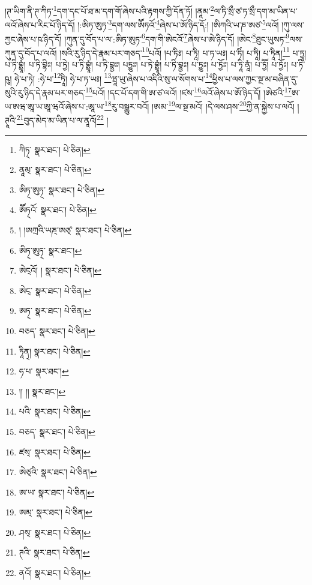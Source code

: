 །ཊ་ཡིག་ནི་ཊ་ཀིཏ་\footnote{ཀིཏ྄་  སྣར་ཐང་།  པེ་ཅིན། }དག་དང་པོ་ཐ་མ་དག་གོ་ཞེས་པའི་རྟགས་ཀྱི་དོན་ཏོ། །ནཱམ་\footnote{ནཱམ྄་  སྣར་ཐང་།  པེ་ཅིན། }ལ་ཏི་སྲྀ་ཙ་ཏ་སྲྀ་དག་མ་ཡིན་པ་ལའོ་ཞེས་པ་རིང་པོ་ཉིད་དོ། །:ཨིཏ་ཨུཏ་\footnote{ཨིཏ྄་ཨུཏ྄་  སྣར་ཐང་།  པེ་ཅིན། }དག་ལས་ཨཽཏའོ་\footnote{ཨཽཏ྄འོ་  སྣར་ཐང་།  པེ་ཅིན། }ཞེས་པ་ཨོ་ཉིད་དོ:། །ཨིཀའི་ཡ་ཎ་ཨཙ་\footnote{། །ཨཀྲའི་ཡཎ྄་ཨཙ྄་  སྣར་ཐང་།  པེ་ཅིན། }ལའོ། །ཀུ་ལས་ཀྱང་ཞེས་པ་ཥ་ཉིད་དོ། །ཀུན་དུ་བོད་པ་ལ་:ཨིཏ་ཨུཏ་\footnote{ཨིཏ྄་ཨུཏ྄་  སྣར་ཐང་། }དག་གི་ཨེངའོ་\footnote{ཨེང྄འོ། །  སྣར་ཐང་།  པེ་ཅིན། }ཞེས་པ་ཨེ་ཉིད་དོ། །ཨེང་\footnote{ཨེང྄་  སྣར་ཐང་།  པེ་ཅིན། }ཐུང་ཡུསཏ་\footnote{ཨཏ྄་  སྣར་ཐང་།  པེ་ཅིན། }ལས་ཀུན་དུ་བོད་པ་ལའོ། །སའི་རུ་ཉིད་དེ་རྣམ་པར་གཅད་\footnote{བཅད་  སྣར་ཐང་།  པེ་ཅིན། }པའོ། །པ་ཏིཿ། པ་ཏཱི། པ་ཏ་ཡཿ། པ་ཏིཾ། པ་ཏཱི། པ་ཏཱིན།\footnote{ཏཱིན྄།  སྣར་ཐང་།  པེ་ཅིན། } པ་ཏྱཱ། པ་ཏི་བྷྱཱཾ། པ་ཏི་བྷིཿ། པ་ཏྱེ། པ་ཏི་བྷྱཱཾ། པ་ཏི་བྷྱཿ། པཏྱུཿ། པ་ཏེ་བྷྱཱཾ། པ་ཏི་བྷྱཿ། པ་ཏྱུཿ། པ་ཏྱོཿ། པ་ཏཱི་ནཱཾ། པ་ཏྱཽ། པ་ཏྱོཿ། པ་ཏི་ཥུ། ཧེ་པ་ཏེ། :ཧེ་པ་\footnote{ཧ་པ་  སྣར་ཐང་། }ཏཱི། ཧེ་པ་ཏ་ཡཿ། \footnote{།། །།   སྣར་ཐང་། }ཝཱ་ཡུ་ཞེས་པ་འདིའི་སུ་ལ་སོགས་པ་\footnote{པའི་  སྣར་ཐང་།  པེ་ཅིན། }ཕྱིས་པ་ལས་ཀྱང་སྔ་མ་བཞིན་དུ་སུའི་རུ་ཉིད་དེ་རྣམ་པར་གཅད་\footnote{བཅད་  སྣར་ཐང་།  པེ་ཅིན། }པའོ། །དང་པོ་དག་གི་ཨ་ཙ་ལའོ། །ཛས་\footnote{ཛས྄་  སྣར་ཐང་།  པེ་ཅིན། }ལའོ་ཞེས་པ་ཨོ་ཉིད་དོ། །ཨེཙའི་\footnote{ཨེཙ྄འི་  སྣར་ཐང་།  པེ་ཅིན། }ཨ་ཡ་ཨཝ་ཨཱ་ཡ་ཨཱ་ཝའོ་ཞེས་པ་:ཨཱ་ཡ་\footnote{ཨ་ཡ་  སྣར་ཐང་།  པེ་ཅིན། }རུ་བསྒྱུར་བའོ། །ཨམ་\footnote{ཨམ྄་  སྣར་ཐང་།  པེ་ཅིན། }ལ་སྔ་མའོ། །དེ་ལས་ཤས་\footnote{ཤས྄་  སྣར་ཐང་།  པེ་ཅིན། }ཀྱི་ན་སྐྱེས་པ་ལའོ། །ཊཱའི་\footnote{ཊའི་  སྣར་ཐང་།  པེ་ཅིན། }བུད་མེད་མ་ཡིན་པ་ལ་ནཱའོ།\footnote{ནའོ།  སྣར་ཐང་།  པེ་ཅིན། } །
